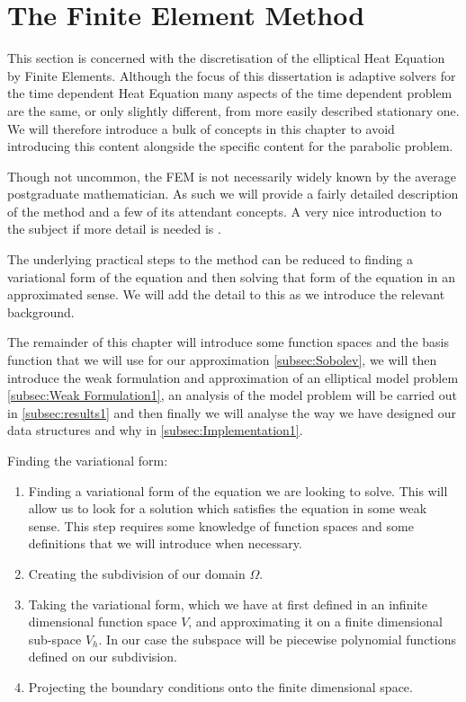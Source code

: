 \documentclass{uonmathreport}
\theoremstyle{definition}
\theoremstyle{problem}
\theoremstyle{theorem}
\begin{document}
\clearpage

\section{The Finite Element Method} \label{sec:FEM}

This section is concerned with the discretisation of the elliptical Heat Equation by Finite Elements. Although the focus of this dissertation is adaptive solvers for the time dependent Heat Equation many aspects of the time dependent problem are the same, or only slightly different, from more easily described stationary one. We will therefore introduce a bulk of concepts in this chapter to avoid introducing this content alongside the specific content for the parabolic problem.  

Though not uncommon, the FEM is not necessarily widely known by the average postgraduate mathematician. As such we will provide a fairly detailed description of the method and a few of its attendant concepts. A very nice introduction to the subject if more detail is needed is \cite{larson2013finite}.

The underlying practical steps to the method can be reduced to finding a variational form of the equation and then solving that form of the equation in an approximated sense. We will add the detail to this as we introduce the relevant background.

The remainder of this chapter will introduce some function spaces and the basis function that we will use for our approximation \ref{subsec:Sobolev}, we will then introduce the weak formulation and approximation of an elliptical model problem \ref{subsec:Weak Formulation1}, an analysis of the model problem will be carried out in \ref{subsec:results1} and then finally we will analyse the way we have designed our data structures and why in \ref{subsec:Implementation1}.

Finding the variational form:

\begin{enumerate}
\item Finding a variational form of the equation we are looking to solve. This will allow us to look for a solution which satisfies the equation in some weak sense. This step requires some knowledge of function spaces and some definitions that we will introduce when necessary. 

\item Creating the subdivision of our domain $\Omega$.

\item Taking the variational form, which we have at first defined in an infinite dimensional function space $V$, and approximating it on a finite dimensional sub-space $V_{h}$. In our case the subspace will be piecewise polynomial functions defined on our subdivision.

\item Projecting the boundary conditions onto the finite dimensional space.
\end{enumerate}
\end{document}
